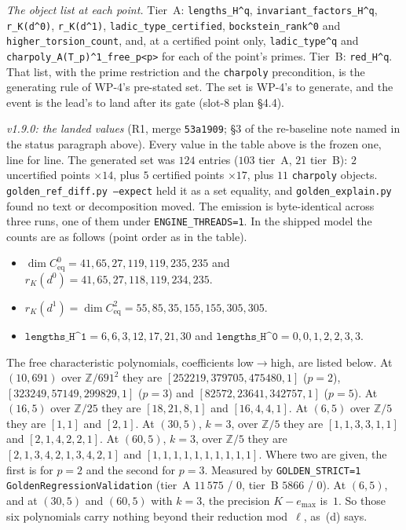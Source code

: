 \documentclass[11pt]{article}
\theoremstyle{remark}
\newcommand{\Z}{\mathbb{Z}}
\begin{document}
\emph{The object list at each point.} Tier~A: \texttt{lengths\_H\textasciicircum q},
\texttt{invariant\_factors\_H\textasciicircum q}, \texttt{r\_K(d\textasciicircum0)},
\texttt{r\_K(d\textasciicircum1)}, \texttt{ladic\_type\_certified},
\texttt{bockstein\_rank\textasciicircum0} and \texttt{higher\_torsion\_count}, and, at a certified
point only, \texttt{ladic\_type\textasciicircum q} and
\texttt{charpoly\_A(T\_p)\textasciicircum1\_free\_p<p>} for each of the point's primes. Tier~B:
\texttt{red\_H\textasciicircum q}. That list, with the prime restriction and the \texttt{charpoly}
precondition, is the generating rule of WP-4's pre-stated set. The set is WP-4's to generate, and
the event is the lead's to land after its gate (slot-8 plan \S4.4).

\emph{v1.9.0: the landed values} (R1, merge \texttt{53a1909}; \S3 of the re-baseline note named
in the status paragraph above). Every value in the table
above is the frozen one, line for line. The generated set was $124$ entries ($103$ tier~A, $21$
tier~B): $2$ uncertified points $\times14$, plus $5$ certified points $\times17$, plus $11$
\texttt{charpoly} objects. \texttt{golden\_ref\_diff.py --expect} held it as a set equality, and
\texttt{golden\_explain.py} found no text or decomposition moved. The emission is byte-identical
across three runs, one of them under \texttt{ENGINE\_THREADS=1}. In the shipped model the counts
are as follows (point order as in the table).
\begin{itemize}
\item $\dim C^0_{\mathrm{eq}}=41,65,27,119,119,235,235$ and
  $r_K(d^0)=41,65,27,118,119,234,235$.
\item $r_K(d^1)=\dim C^2_{\mathrm{eq}}=55,85,35,155,155,305,305$.
\item $\texttt{lengths\_H\textasciicircum1}=6,6,3,12,17,21,30$ and
  $\texttt{lengths\_H\textasciicircum0}=0,0,1,2,2,3,3$.
\end{itemize}
The free characteristic polynomials, coefficients low$\to$high, are listed below. At $(10,691)$
over $\Z/691^2$ they are $[252219,379705,475480,1]$ ($p=2$), $[323249,57149,299829,1]$ ($p=3$)
and $[82572,23641,342757,1]$ ($p=5$). At $(16,5)$ over $\Z/25$ they are $[18,21,8,1]$ and
$[16,4,4,1]$. At $(6,5)$ over $\Z/5$ they are $[1,1]$ and $[2,1]$. At $(30,5)$, $k=3$, over
$\Z/5$ they are $[1,1,3,3,1,1]$ and $[2,1,4,2,2,1]$. At $(60,5)$, $k=3$, over $\Z/5$ they are
$[2,1,3,4,2,1,3,4,2,1]$ and $[1,1,1,1,1,1,1,1,1,1]$. Where two are given, the first is for $p=2$
and the second for $p=3$. Measured by
\texttt{GOLDEN\_STRICT=1 GoldenRegressionValidation} (tier~A $11\,575$ / $0$, tier~B $5866$ /
$0$). At $(6,5)$, and at $(30,5)$ and $(60,5)$ with $k=3$, the precision $K-e_{\max}$ is~$1$. So
those six polynomials carry nothing beyond their reduction mod~$\ell$, as~(d) says.
\end{document}
